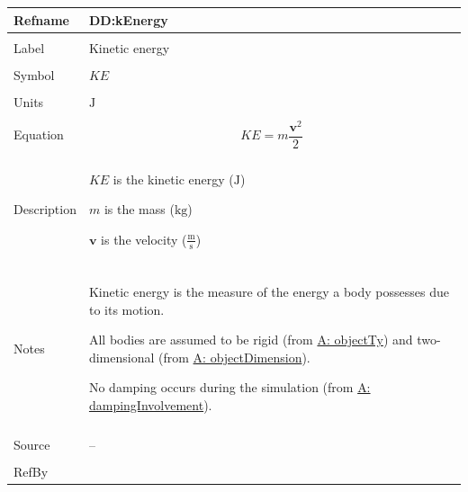 \documentclass[12pt]{article}
\begin{document}
\vspace{\baselineskip}
\noindent
\begin{minipage}{\textwidth}
\begin{tabular}{>{\raggedright}p{}>{\raggedright\arraybackslash}p{}}
\toprule \textbf{Refname} & \textbf{DD:kEnergy}
\label{DD:kEnergy}
\\ \midrule \\
Label & Kinetic energy
        
\\ \midrule \\
Symbol & $KE$
         
\\ \midrule \\
Units & ${\text{J}}$
        
\\ \midrule \\
Equation & \begin{displaymath}
           KE=m \frac{\mathbf{v}^{2}}{2}
           \end{displaymath}
\\ \midrule \\
Description & \begin{symbDescription}
              \item{$KE$ is the kinetic energy (${\text{J}}$)}
              \item{$m$ is the mass (${\text{kg}}$)}
              \item{$\mathbf{v}$ is the velocity ($\frac{\text{m}}{\text{s}}$)}
              \end{symbDescription}
\\ \midrule \\
Notes & Kinetic energy is the measure of the energy a body possesses due to its motion.
        
        All bodies are assumed to be rigid (from \hyperref[assumpOT]{A: objectTy}) and two-dimensional (from \hyperref[assumpOD]{A: objectDimension}).
        
        No damping occurs during the simulation (from \hyperref[assumpDI]{A: dampingInvolvement}).
        
\\ \midrule \\
Source & --
         
\\ \midrule \\
RefBy & 
\\ \bottomrule
\end{tabular}
\end{minipage}
\end{document}
